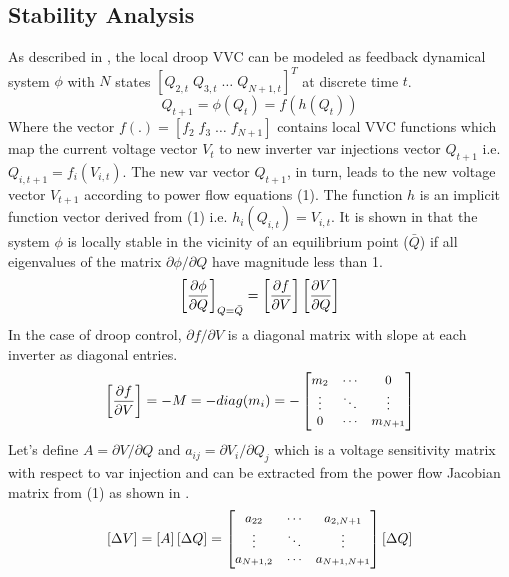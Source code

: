 \documentclass[journal]{IEEEtran}
\begin{document}
\subsection{Stability Analysis}
As described in \cite{farivar_equilibrium_2013,jahangiri_distributed_2013},  the local droop VVC can be modeled as feedback dynamical system $\phi$ with $N$ states $[Q_{2,t}\;Q_{3,t}\; \dots\;Q_{N+1,t}]^T$ at discrete time $t$.
\begin{equation}
\label{eq:phi}
Q_{t+1}=\phi(Q_t)=f(h(Q_t))
\end{equation}
Where the vector $f(.)\!=\![f_2\;f_3\;\dots\;f_{N+1}]$ contains local VVC functions which map the current voltage vector $V_t$ to new inverter var injections vector $Q_{t+1}$ i.e. $Q_{i,t+1}\!=\!f_i (V_{i,t})$. The new var vector $Q_{t+1}$, in turn, leads to the new voltage vector $V_{t+1}$ according to power flow equations (1). The function $h$ is an implicit function vector derived from (1) i.e. $h_i (Q_{i,t} )=V_{i,t}$. It is shown in \cite{jahangiri_distributed_2013} that the system $\phi$ is locally stable in the vicinity of an equilibrium point ($\bar{Q}$) if all eigenvalues of the matrix $\partial \phi/\partial Q$ have magnitude less than 1.
\begin{equation}
\small
\label{eq:phi_slope}
\left[\frac{\partial\phi}{\partial Q}\right]_{Q=\bar{Q}}=
\left[\frac{\partial f}{\partial V}\right]
\left[\frac{\partial V}{\partial Q}\right]
\end{equation}
In the case of droop control, $\partial f/\partial V$ is a diagonal matrix with slope at each inverter as diagonal entries. 
\begin{equation}
\small
\label{eq:M}
\left[\frac{\partial f}{\partial V}\right]=-M=-diag(m_i)=-
\begin{bmatrix}
m_2 & \cdots & 0\\ 
\vdots & \ddots & \vdots\\
0 & \cdots & m_{N+1}\\ 
\end{bmatrix}
\end{equation}
Let’s define {\small $A\!=\!\partial V/\partial Q$} and  {\small $a_{ij}\!=\!\partial V_i/\partial Q_j$} which is a voltage sensitivity matrix with respect to var injection and can be extracted from the power flow Jacobian matrix from (1) as shown in \cite{jahangiri_distributed_2013}.   
\begin{equation}
\small
\label{eq:A}
\left[\Delta V\right]=\left[A\right]\left[\Delta Q\right]=
\begin{bmatrix}
a_{22} & \cdots & a_{2,N+1}\\ 
\vdots & \ddots & \vdots\\
a_{N+1,2} & \cdots & a_{N+1,N+1}\\ 
\end{bmatrix} \left[\Delta Q\right]
\end{equation} 
\end{document}
